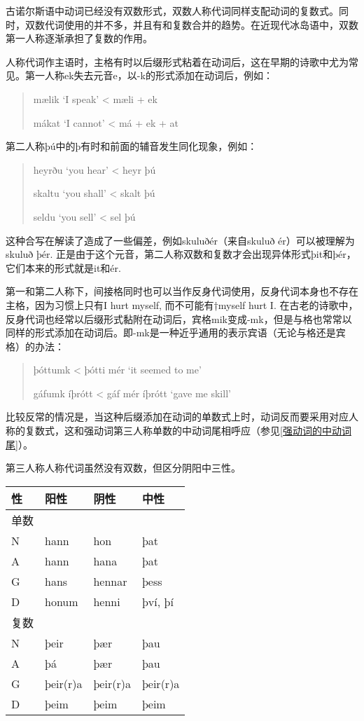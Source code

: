古诺尔斯语中动词已经没有双数形式，双数人称代词同样支配动词的复数式。同时，双数代词使用的并不多，并且有和复数合并的趋势。在近现代冰岛语中，双数第一人称逐渐承担了复数的作用。

人称代词作主语时，主格有时以后缀形式粘着在动词后，这在早期的诗歌中尤为常见。第一人称ek失去元音e，以-k的形式添加在动词后，例如：

\begin{quote}
    mælik `I speak‌' < mæli + ek

    mákat `I cannot‌' < má + ek + at
\end{quote}

第二人称þú中的þ有时和前面的辅音发生同化现象，例如：

\begin{quote}
    heyrðu `you hear' < heyr þú

    skaltu `you shall' < skalt þú

    seldu `you sell' < sel þú
\end{quote}

这种合写在解读了造成了一些偏差，例如skuluðér（来自skuluð ér）可以被理解为skuluð þér.
正是由于这个元音，第二人称双数和复数才会出现异体形式þit和þér，它们本来的形式就是it和ér.

第一和第二人称下，间接格同时也可以当作反身代词使用，反身代词本身也不存在主格，因为习惯上只有I hurt myself, 而不可能有†myself hurt I. 在古老的诗歌中，反身代词也经常以后缀形式黏附在动词后，宾格mik变成-mk，但是与格也常常以同样的形式添加在动词后。即-mk是一种近乎通用的表示宾语（无论与格还是宾格）的办法：

\begin{quote}
    þóttumk < þótti mér `it seemed to me‌'

    gáfumk íþrótt < gáf mér íþrótt `gave me skill'
\end{quote}

比较反常的情况是，当这种后缀添加在动词的单数式上时，动词反而要采用对应人称的复数式，这和强动词第三人称单数的中动词尾相呼应（参见\ref{强动词的中动词尾}）。

第三人称人称代词虽然没有双数，但区分阴阳中三性。

\begin{longtable}{llll}
    \toprule
    性   & 阳性     & 阴性     & 中性     \\
    \midrule
    \endhead
    \bottomrule
    \endfoot
    单数 &          &          &          \\
    N    & hann     & hon      & þat      \\
    A    & hann     & hana     & þat      \\
    G    & hans     & hennar   & þess     \\
    D    & honum    & henni    & því, þí  \\
    复数 &          &          &          \\
    N    & þeir     & þær      & þau      \\
    A    & þá       & þær      & þau      \\
    G    & þeir(r)a & þeir(r)a & þeir(r)a \\
    D    & þeim     & þeim     & þeim     \\
\end{longtable}


